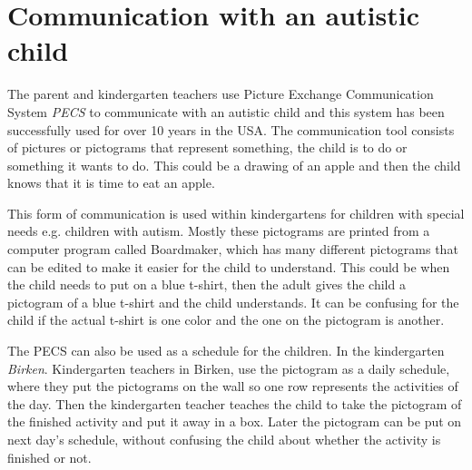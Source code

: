 \section{Communication with an autistic child}
The parent and kindergarten teachers use Picture Exchange Communication System \textit{PECS} to communicate with an autistic child and this system has been successfully used for over 10 years in the USA. The communication tool consists of pictures or pictograms that represent something, the child is to do or something it wants to do. This could be a drawing of an apple and then the child knows that it is time to eat an apple. 

This form of communication is used within kindergartens for children with special needs e.g. children with autism. Mostly these pictograms are printed from a computer program called Boardmaker, which has many different pictograms that can be edited to make it easier for the child to understand. This could be when the child needs to put on a blue t-shirt, then the adult gives the child a pictogram of a blue t-shirt and the child understands. It can be confusing for the child if the actual t-shirt is one color and the one on the pictogram is another.

The PECS can also be used as a schedule for the children. In the kindergarten \textit{Birken}. Kindergarten teachers in Birken, use the pictogram as a daily schedule, where they put the pictograms on the wall so one row represents the activities of the day. Then the kindergarten teacher teaches the child to take the pictogram of the finished activity and put it away in a box. Later the pictogram can be put on next day's schedule, without confusing the child about whether the activity is finished or not.
